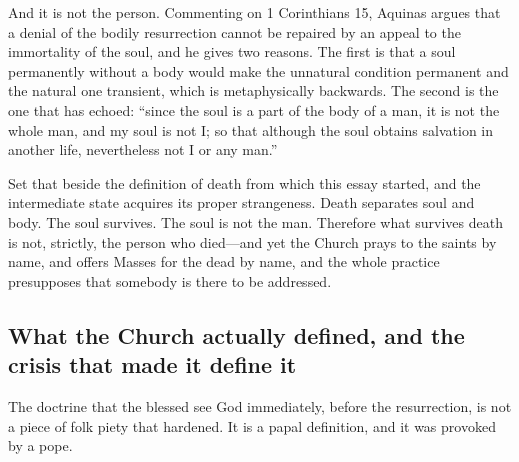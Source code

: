 And it is not the person. Commenting on 1 Corinthians 15, Aquinas argues that a denial of the bodily resurrection cannot be repaired by an appeal to the immortality of the soul, and he gives two reasons. The first is that a soul permanently without a body would make the unnatural condition permanent and the natural one transient, which is metaphysically backwards. The second is the one that has echoed: ``since the soul is a part of the body of a man, it is not the whole man, and my soul is not I; so that although the soul obtains salvation in another life, nevertheless not I or any man.''

Set that beside the definition of death from which this essay started, and the intermediate state acquires its proper strangeness. Death separates soul and body. The soul survives. The soul is not the man. Therefore what survives death is not, strictly, the person who died---and yet the Church prays to the saints by name, and offers Masses for the dead by name, and the whole practice presupposes that somebody is there to be addressed.

\subsection{What the Church actually defined, and the crisis that made it define it}

The doctrine that the blessed see God immediately, before the resurrection, is not a piece of folk piety that hardened. It is a papal definition, and it was provoked by a pope.

